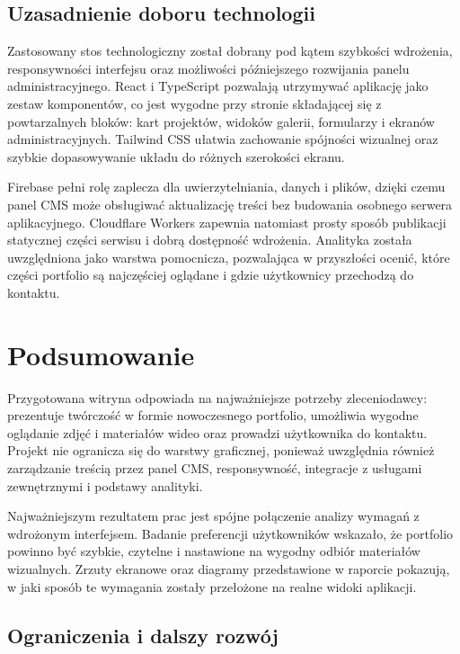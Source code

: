 \section{Uzasadnienie doboru technologii}

Zastosowany stos technologiczny został dobrany pod kątem szybkości wdrożenia, responsywności interfejsu oraz możliwości późniejszego rozwijania panelu administracyjnego. React i TypeScript pozwalają utrzymywać aplikację jako zestaw komponentów, co jest wygodne przy stronie składającej się z powtarzalnych bloków: kart projektów, widoków galerii, formularzy i ekranów administracyjnych. Tailwind CSS ułatwia zachowanie spójności wizualnej oraz szybkie dopasowywanie układu do różnych szerokości ekranu.

Firebase pełni rolę zaplecza dla uwierzytelniania, danych i plików, dzięki czemu panel CMS może obsługiwać aktualizację treści bez budowania osobnego serwera aplikacyjnego. Cloudflare Workers zapewnia natomiast prosty sposób publikacji statycznej części serwisu i dobrą dostępność wdrożenia. Analityka została uwzględniona jako warstwa pomocnicza, pozwalająca w przyszłości ocenić, które części portfolio są najczęściej oglądane i gdzie użytkownicy przechodzą do kontaktu.

\chapter{Podsumowanie}

Przygotowana witryna odpowiada na najważniejsze potrzeby zleceniodawcy: prezentuje twórczość w formie nowoczesnego portfolio, umożliwia wygodne oglądanie zdjęć i materiałów wideo oraz prowadzi użytkownika do kontaktu. Projekt nie ogranicza się do warstwy graficznej, ponieważ uwzględnia również zarządzanie treścią przez panel CMS, responsywność, integracje z usługami zewnętrznymi i podstawy analityki.

Najważniejszym rezultatem prac jest spójne połączenie analizy wymagań z wdrożonym interfejsem. Badanie preferencji użytkowników wskazało, że portfolio powinno być szybkie, czytelne i nastawione na wygodny odbiór materiałów wizualnych. Zrzuty ekranowe oraz diagramy przedstawione w raporcie pokazują, w jaki sposób te wymagania zostały przełożone na realne widoki aplikacji.

\section{Ograniczenia i dalszy rozwój}

